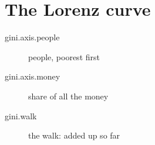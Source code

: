 \section{The Lorenz curve}

\begin{description}
  \item[gini.axis.people] people, poorest first
  \item[gini.axis.money] share of all the money
  \item[gini.walk] the walk: added up so far
\end{description}
